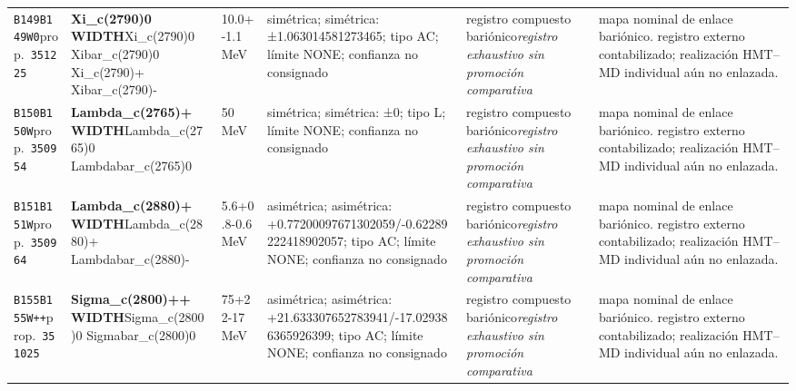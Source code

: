 \begin{landscape}
\begin{longtable}{L{1.85cm}L{4.45cm}L{2.35cm}L{4.05cm}L{3.35cm}L{7.15cm}}
\texttt{B149}\newline \texttt{B149W0}\newline prop.\ \texttt{351225} & \textbf{Xi\_\allowbreak{}c(2790)0 WIDTH}\newline Xi\_\allowbreak{}c(2790)0 \textbar{}\allowbreak{} Xibar\_\allowbreak{}c(2790)0 \textbar{}\allowbreak{} Xi\_\allowbreak{}c(2790)+ \textbar{}\allowbreak{} Xibar\_\allowbreak{}c(2790)- & 10.0+-1.1\,MeV & simétrica; simétrica: ±1.063014581273465; tipo AC; límite NONE; confianza no consignado & registro compuesto bariónico\newline \emph{registro exhaustivo sin promoción comparativa} & mapa nominal de enlace bariónico. registro externo contabilizado; realización HMT--MD individual aún no enlazada. \\
\texttt{B150}\newline \texttt{B150W}\newline prop.\ \texttt{350954} & \textbf{Lambda\_\allowbreak{}c(2765)+ WIDTH}\newline Lambda\_\allowbreak{}c(2765)0 \textbar{}\allowbreak{} Lambdabar\_\allowbreak{}c(2765)0 & 50\,MeV & simétrica; simétrica: ±0; tipo L; límite NONE; confianza no consignado & registro compuesto bariónico\newline \emph{registro exhaustivo sin promoción comparativa} & mapa nominal de enlace bariónico. registro externo contabilizado; realización HMT--MD individual aún no enlazada. \\
\texttt{B151}\newline \texttt{B151W}\newline prop.\ \texttt{350964} & \textbf{Lambda\_\allowbreak{}c(2880)+ WIDTH}\newline Lambda\_\allowbreak{}c(2880)+ \textbar{}\allowbreak{} Lambdabar\_\allowbreak{}c(2880)- & 5.6+0.8-0.6\,MeV & asimétrica; asimétrica: +0.77200097671302059/-0.62289222418902057; tipo AC; límite NONE; confianza no consignado & registro compuesto bariónico\newline \emph{registro exhaustivo sin promoción comparativa} & mapa nominal de enlace bariónico. registro externo contabilizado; realización HMT--MD individual aún no enlazada. \\
\texttt{B155}\newline \texttt{B155W++}\newline prop.\ \texttt{351025} & \textbf{Sigma\_\allowbreak{}c(2800)++ WIDTH}\newline Sigma\_\allowbreak{}c(2800)0 \textbar{}\allowbreak{} Sigmabar\_\allowbreak{}c(2800)0 & 75+22-17\,MeV & asimétrica; asimétrica: +21.633307652783941/-17.029386365926399; tipo AC; límite NONE; confianza no consignado & registro compuesto bariónico\newline \emph{registro exhaustivo sin promoción comparativa} & mapa nominal de enlace bariónico. registro externo contabilizado; realización HMT--MD individual aún no enlazada. \\

\end{longtable}
\end{landscape}

